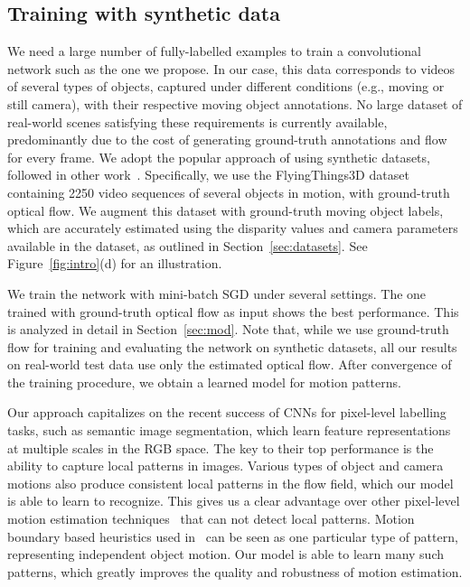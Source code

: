 \documentclass[10pt,twocolumn,letterpaper]{article}
\begin{document}
\subsection{Training with synthetic data}
\label{sec:train}
We need a large number of fully-labelled examples to train a convolutional
network such as the one we propose. In our case, this data corresponds to
videos of several types of objects, captured under different conditions (e.g.,
moving or still camera), with their respective moving object annotations. No
large dataset of real-world scenes satisfying these requirements is currently
available, predominantly due to the cost of generating ground-truth annotations
and flow for every frame. We adopt the popular approach of using synthetic
datasets, followed in other work~\cite{Dosovitskiy15,Mayer16,Gaidon16}.
Specifically, we use the FlyingThings3D dataset~\cite{Mayer16} containing 2250
video sequences of several objects in motion, with ground-truth optical flow.
We augment this dataset with ground-truth moving object labels, which are
accurately estimated using the disparity values and camera parameters available
in the dataset, as outlined in Section~\ref{sec:datasets}. See
Figure~\ref{fig:intro}(d) for an illustration.

We train the network with mini-batch SGD under several settings. The one
trained with ground-truth optical flow as input shows the best performance.
This is analyzed in detail in Section~\ref{sec:mod}. Note that, while we use
ground-truth flow for training and evaluating the network on synthetic
datasets, all our results on real-world test data use only the estimated
optical flow. After convergence of the training procedure, we obtain a learned
model for motion patterns.

Our approach capitalizes on the recent success of CNNs for pixel-level
labelling tasks, such as semantic image segmentation, which learn feature
representations at multiple scales in the RGB space. The key to their top
performance is the ability to capture local patterns in images. Various types
of object and camera motions also produce consistent local patterns in the flow
field, which our model is able to learn to recognize. This gives us a clear
advantage over other pixel-level motion estimation
techniques~\cite{Bideau16,Narayana13} that can not detect local patterns.
Motion boundary based heuristics used in~\cite{papazoglou2013fast} can be seen
as one particular type of pattern, representing independent object motion. Our
model is able to learn many such patterns, which greatly improves the quality
and robustness of motion estimation.
\end{document}
